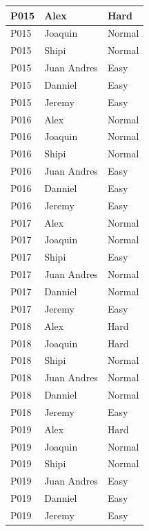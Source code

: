 \begin{longtable}{
    |
    >{\centering\arraybackslash}p{4.5cm}|
    >{\centering\arraybackslash}p{4.5cm}|
    >{\centering\arraybackslash}p{4.5cm}|
}
    P015 & Alex        & Hard \\ \hline
    P015 & Joaquin     & Normal \\ \hline
    P015 & Shipi       & Normal \\ \hline
    P015 & Juan Andres & Easy \\ \hline
    P015 & Danniel     & Easy \\ \hline
    P015 & Jeremy      & Easy \\ \hline

    P016 & Alex        & Normal \\ \hline
    P016 & Joaquin     & Normal \\ \hline
    P016 & Shipi       & Normal \\ \hline
    P016 & Juan Andres & Easy \\ \hline
    P016 & Danniel     & Easy \\ \hline
    P016 & Jeremy      & Easy \\ \hline

    P017 & Alex        & Normal \\ \hline
    P017 & Joaquin     & Normal \\ \hline
    P017 & Shipi       & Easy \\ \hline
    P017 & Juan Andres & Normal \\ \hline
    P017 & Danniel     & Normal \\ \hline
    P017 & Jeremy      & Easy \\ \hline

    P018 & Alex        & Hard \\ \hline
    P018 & Joaquin     & Hard \\ \hline
    P018 & Shipi       & Normal \\ \hline
    P018 & Juan Andres & Normal \\ \hline
    P018 & Danniel     & Normal \\ \hline
    P018 & Jeremy      & Easy \\ \hline

    P019 & Alex        & Hard \\ \hline
    P019 & Joaquin     & Normal \\ \hline
    P019 & Shipi       & Normal \\ \hline
    P019 & Juan Andres & Easy \\ \hline
    P019 & Danniel     & Easy \\ \hline
    P019 & Jeremy      & Easy \\ \hline


\end{longtable}
